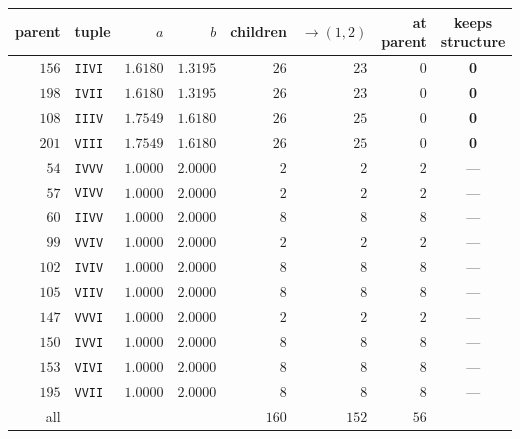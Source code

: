\begin{tabular}{rlrrrrrc}
\hline
parent & tuple & $a$ & $b$ & children & $\to(1,2)$ & at parent & keeps structure \\
\hline
$156$ & \texttt{IIVI} & $1.6180$ & $1.3195$ & $26$ & $23$ & $0$ & \textbf{0} \\
$198$ & \texttt{IVII} & $1.6180$ & $1.3195$ & $26$ & $23$ & $0$ & \textbf{0} \\
$108$ & \texttt{IIIV} & $1.7549$ & $1.6180$ & $26$ & $25$ & $0$ & \textbf{0} \\
$201$ & \texttt{VIII} & $1.7549$ & $1.6180$ & $26$ & $25$ & $0$ & \textbf{0} \\
$54$ & \texttt{IVVV} & $1.0000$ & $2.0000$ & $2$ & $2$ & $2$ & --- \\
$57$ & \texttt{VIVV} & $1.0000$ & $2.0000$ & $2$ & $2$ & $2$ & --- \\
$60$ & \texttt{IIVV} & $1.0000$ & $2.0000$ & $8$ & $8$ & $8$ & --- \\
$99$ & \texttt{VVIV} & $1.0000$ & $2.0000$ & $2$ & $2$ & $2$ & --- \\
$102$ & \texttt{IVIV} & $1.0000$ & $2.0000$ & $8$ & $8$ & $8$ & --- \\
$105$ & \texttt{VIIV} & $1.0000$ & $2.0000$ & $8$ & $8$ & $8$ & --- \\
$147$ & \texttt{VVVI} & $1.0000$ & $2.0000$ & $2$ & $2$ & $2$ & --- \\
$150$ & \texttt{IVVI} & $1.0000$ & $2.0000$ & $8$ & $8$ & $8$ & --- \\
$153$ & \texttt{VIVI} & $1.0000$ & $2.0000$ & $8$ & $8$ & $8$ & --- \\
$195$ & \texttt{VVII} & $1.0000$ & $2.0000$ & $8$ & $8$ & $8$ & --- \\
\hline
all & & & & $160$ & $152$ & $56$ & \\
\hline
\end{tabular}
